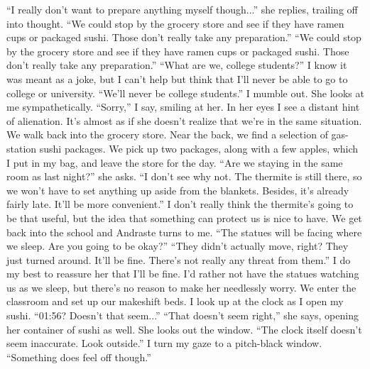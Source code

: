 \documentclass[a4paper, 12pt]{book}
\newcommand\tab[1][1cm]{\hspace*{#1}}
\begin{document}
\newline
\tab
``I really don’t want to prepare anything myself though...'' she replies, trailing off into thought.
\newline
\tab
``We could stop by the grocery store and see if they have ramen cups or packaged sushi. Those don’t really take any preparation.'' 
\newline
\tab
``We could stop by the grocery store and see if they have ramen cups or packaged sushi. Those don’t really take any preparation.'' 
\newline
\tab
``What are we, college students?''
\newline
\tab
I know it was meant as a joke, but I can’t help but think that I’ll never be able to go to college or university. ``We’ll never be college students.'' I mumble out. She looks at me sympathetically. ``Sorry,'' I say, smiling at her. In her eyes I see a distant hint of alienation. It’s almost as if she doesn’t realize that we’re in the same situation. 
\newline
\tab
We walk back into the grocery store. Near the back, we find a selection of gas-station sushi packages. We pick up two packages, along with a few apples, which I put in my bag, and leave the store for the day. ``Are we staying in the same room as last night?'' she asks.
\newline
\tab
``I don’t see why not. The thermite is still there, so we won’t have to set anything up aside from the blankets. Besides, it’s already fairly late. It’ll be more convenient.'' I don’t really think the thermite’s going to be that useful, but the idea that something can protect us is nice to have.
\newline
\tab
We get back into the school and Andraste turns to me. ``The statues will be facing where we sleep. Are you going to be okay?''
\newline
\tab
``They didn’t actually move, right? They just turned around. It’ll be fine. There’s not really any threat from them.'' I do my best to reassure her that I’ll be fine. I’d rather not have the statues watching us as we sleep, but there’s no reason to make her needlessly worry. We enter the classroom and set up our makeshift beds. I look up at the clock as I open my sushi. ``01:56? Doesn’t that seem...''
\newline
\tab
``That doesn’t seem right,'' she says, opening her container of sushi as well. She looks out the window. ``The clock itself doesn’t seem inaccurate. Look outside.'' I turn my gaze to a pitch-black window. ``Something does feel off though.''
\end{document}
